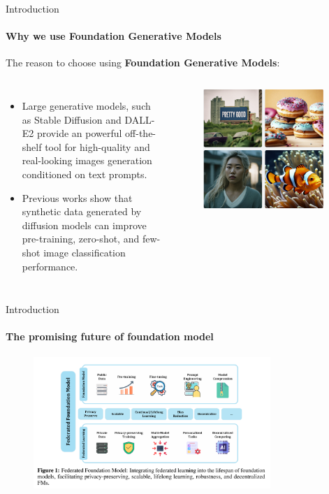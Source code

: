 \documentclass{beamer}
\begin{document}
\begin{frame}{Introduction}
\framesubtitle{Why we use Foundation Generative Models}
The reason to choose using \textbf{Foundation Generative Models}:

\begin{columns}
	\begin{itemize}
	\item Large generative models, such as Stable Diffusion and DALL-E2 provide an powerful off-the-shelf tool for high-quality and real-looking images 
	generation conditioned on text prompts.
	\item Previous works show that synthetic data generated by
	diffusion models can improve pre-training, zero-shot, and few-shot image classification performance.
	\end{itemize}
		\begin{figure}
			\centering
			\includegraphics[width=0.95\textwidth]
			{assets/stable}
		\end{figure}
	\end{columns}
\end{frame}

\begin{frame}{Introduction}
\framesubtitle{The promising future of foundation model}
	\begin{figure}
		\centering
		\includegraphics[width=0.8\textwidth]
		{assets/FM}
	\end{figure}
	
\end{frame}
\end{document}
